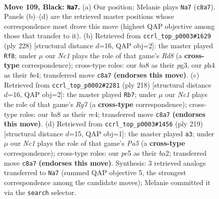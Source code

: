 \documentclass[11pt]{article}
\begin{document}
\clearpage

\begin{figure}[p]\centering
\begin{subfigure}{0.46\textwidth}\centering
\resizebox{\linewidth}{!}{%
\newchessgame
\chessboard[
  setfen={B1n5/6k1/8/2P3PK/7P/8/8/8 b - - 0 109},
  showmover=false,
  pgfstyle=straightmove, color=movearrow, markmove={c8-a7}
]}
\caption{}
\end{subfigure}\hfill
\begin{subfigure}{0.46\textwidth}\centering
\resizebox{\linewidth}{!}{%
\newchessgame
\chessboard[
  setfen={3R4/8/8/8/4b3/4kpp1/8/5K2 w - - 80 115},
  showmover=false,
  pgfstyle=straightmove, color=movearrow, markmove={d8-f8}
]}
\caption{}
\end{subfigure}
\\[4pt]
\begin{subfigure}{0.46\textwidth}\centering
\resizebox{\linewidth}{!}{%
\newchessgame
\chessboard[
  setfen={8/6R1/8/5p2/2r2k2/5p2/8/5K2 w - - 16 110},
  showmover=false,
  pgfstyle=straightmove, color=movearrow, markmove={g7-b7}
]}
\caption{}
\end{subfigure}\hfill
\begin{subfigure}{0.46\textwidth}\centering
\resizebox{\linewidth}{!}{%
\newchessgame
\chessboard[
  setfen={8/8/1k6/8/p2K4/2PP2b1/B7/8 b - - 3 110},
  showmover=false,
  pgfstyle=straightmove, color=movearrow, markmove={a4-a3}
]}
\caption{}
\end{subfigure}
\caption{\textbf{Move 109, Black: \texttt{Na7}.} (a) Our position; Melanie plays \texttt{Na7} (\texttt{c8a7}). Panels (b)--(d) are the retrieved master positions whose correspondence most drove this move (highest QAP objective among those that transfer to it). (b) Retrieved from \texttt{ccrl\_top\_p0003\#1629} (ply 228) [structural distance $d$=16, QAP obj=2]: the master played \texttt{Rf8}; under $\mu$ our \emph{Nc1} plays the role of that game's \emph{Rd8} (a \textbf{cross-type} correspondence); cross-type roles: our \emph{b}a8 as their \emph{p}g3, our \emph{p}h4 as their \emph{b}e4; transferred move \texttt{c8a7} \textbf{(endorses this move)}. (c) Retrieved from \texttt{ccrl\_top\_p0002\#2281} (ply 218) [structural distance $d$=16, QAP obj=2]: the master played \texttt{Rb7}; under $\mu$ our \emph{Nc1} plays the role of that game's \emph{Rg7} (a \textbf{cross-type} correspondence); cross-type roles: our \emph{b}a8 as their \emph{r}c4; transferred move \texttt{c8a7} \textbf{(endorses this move)}. (d) Retrieved from \texttt{ccrl\_top\_p0003\#1456} (ply 219) [structural distance $d$=15, QAP obj=1]: the master played \texttt{a3}; under $\mu$ our \emph{Nc1} plays the role of that game's \emph{Pa5} (a \textbf{cross-type} correspondence); cross-type roles: our \emph{p}c5 as their \emph{b}a2; transferred move \texttt{c8a7} \textbf{(endorses this move)}. Synthesis: 3 retrieved analogs transferred to \texttt{Na7} (summed QAP objective 5, the strongest correspondence among the candidate moves); Melanie committed it via the \texttt{search} selector.}
\label{fig:thought-m217}
\end{figure}
\end{document}
